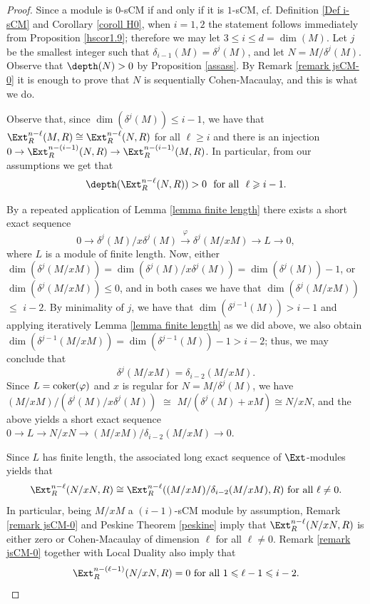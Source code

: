 \documentclass[12pt]{amsart}
\theoremstyle{definition}
\theoremstyle{definition}
\renewcommand{\leq}{\leqslant}
\renewcommand{\geq}{\geqslant}
\let\lra\longrightarrow
\begin{document}
\begin{proof}
Since a module is $0$-sCM if and only if it is $1$-sCM, cf. Definition \ref{Def i-sCM} and Corollary \ref{coroll H0},  when  $i=1,2$ the statement follows immediately from Proposition \ref{hscor1.9}; therefore we may let $3 \leq i \leq d=\dim(M)$. 
Let $j$ be the smallest integer such that $\delta_{i-1}(M) = \delta^j(M)$, and let $N = M/\delta^j(M)$. Observe that $\depth (N)>0$ by Proposition \ref{assass}. By Remark \ref{remark jsCM-0} it is enough to prove that $N$ is sequentially Cohen-Macaulay, and this is what we do.

  Observe that, since $\dim(\delta^j(M)) \leq i-1$, we have that $\Ext^{n-\ell}_R(M,R) \cong \Ext^{n-\ell}_R(N,R)$ for all $\ell \geq i$ and there is an injection $0 \to \Ext^{n-(i-1)}_R(N,R) \to  \Ext^{n-(i-1)}_R(M,R)$. In particular, from our assumptions we get that
  $$\depth(\Ext^{n-\ell}_R(N,R))>0 \text{\,\, for all \,\,} \ell \geq i-1.$$

  \noindent By a repeated application of Lemma \ref{lemma finite length} there exists a short exact sequence
  $$0 \lra \delta^j(M)/x\delta^j(M)\stackrel{\varphi}{\lra}\delta^j(M/xM) \lra L \lra 0,$$
  where $L$ is a module of finite length.  Now, either  $\dim(\delta^j(M/xM))= \dim(\delta^j(M)/x\delta^j(M)) = \dim(\delta^j(M))-1$, or $\dim(\delta^j(M/xM))\leq 0$, and in both cases we have that $\dim(\delta^j(M/xM))$ $\leq $ $i-2$. By minimality of $j$, we have that $\dim(\delta^{j-1}(M)) > i-1$ and applying iteratively Lemma \ref{lemma finite length} as we did above, we also obtain  $\dim(\delta^{j-1}(M/xM)) = \dim(\delta^{j-1}(M))-1 > i-2$; thus, we may conclude that $$\delta^j(M/xM) = \delta_{i-2}(M/xM).$$
 Since $L={\rm coker}(\varphi)$ and  $x$ is regular for  $N= M/\delta^j(M)$, we have $(M/xM)/(\delta^j(M)/x\delta^j(M))$ $\cong $ $M/(\delta^j(M)+xM) \cong N/xN$, and the above yields a short exact sequence $0 \to L \to N/xN \to (M/xM)/\delta_{i-2}(M/xM) \to 0.$


Since $L$ has finite length, the associated long exact sequence of $\Ext$-modules yields that $$\Ext^{n-\ell}_R(N/xN,R) \cong \Ext^{n-\ell}_R((M/xM)/\delta_{i-2}(M/xM),R) \text{\,\,for all\,\,}  \ell \ne 0.$$ In particular, being $M/xM$ a $(i-1)$-sCM module by assumption, Remark \ref{remark jsCM-0} and Peskine Theorem \ref{peskine} imply that $\Ext^{n-\ell}_R(N/xN,R)$ is either zero or Cohen-Macaulay of dimension $\ell$ for all $\ell\neq 0$. Remark \ref{remark jsCM-0} together with Local Duality also imply that  
\[
\Ext^{n-(\ell-1)}_R(N/xN,R)=0 \text{ for all } 1 \leq \ell-1 \leq i-2.
\]


\end{proof}
\end{document}
